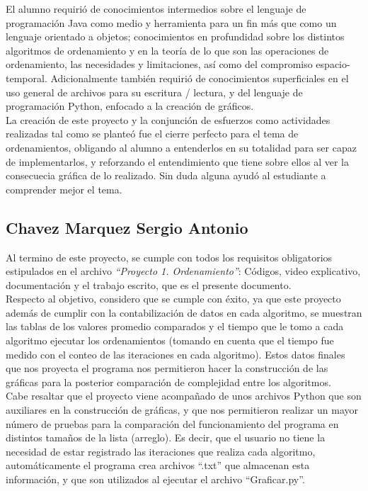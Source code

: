 \documentclass[a4paper,12pt]{article}
\begin{document}
El alumno requirió de conocimientos intermedios sobre el lenguaje de programación Java como medio y herramienta para un fin más que como un lenguaje orientado a objetos; conocimientos en profundidad sobre los distintos algoritmos de ordenamiento y en la teoría de lo que son las operaciones de ordenamiento, las necesidades y limitaciones, así como del compromiso espacio-temporal. Adicionalmente también requirió de conocimientos superficiales en el uso general de archivos para su escritura / lectura, y del lenguaje de programación Python, enfocado a la creación de gráficos.\\

La creación de este proyecto y la conjunción de esfuerzos como actividades realizadas tal como se planteó fue el cierre perfecto para el tema de ordenamientos, obligando al alumno a entenderlos en su totalidad para ser capaz de implementarlos, y reforzando el entendimiento que tiene sobre ellos al ver la consecuecia gráfica de lo realizado. Sin duda alguna ayudó al estudiante a comprender mejor el tema.

\subsection{Chavez Marquez Sergio Antonio}

Al termino de este proyecto, se cumple con todos los requisitos obligatorios estipulados en el archivo \textit{“Proyecto 1. Ordenamiento”}: Códigos, video explicativo, documentación y el trabajo escrito, que es el presente documento.\\

Respecto al objetivo, considero que se cumple con éxito, ya que este proyecto además de cumplir con la contabilización de datos en cada algoritmo, se muestran las tablas de los valores promedio comparados y el tiempo que le tomo a cada algoritmo ejecutar los ordenamientos (tomando en cuenta que el tiempo fue medido con el conteo de las iteraciones en cada algoritmo). Estos datos finales que nos proyecta el programa nos permitieron hacer la construcción de las gráficas para la posterior comparación de complejidad entre los algoritmos.\\

Cabe resaltar que el proyecto viene acompañado de unos archivos Python que son auxiliares en la construcción de gráficas, y que nos permitieron realizar un mayor número de pruebas para la comparación del funcionamiento del programa en distintos tamaños de la lista (arreglo). Es decir, que el usuario no tiene la necesidad de estar registrado las iteraciones que realiza cada algoritmo, automáticamente el programa crea archivos “.txt” que almacenan esta información, y que son utilizados al ejecutar el archivo “Graficar.py”.\\
\end{document}
